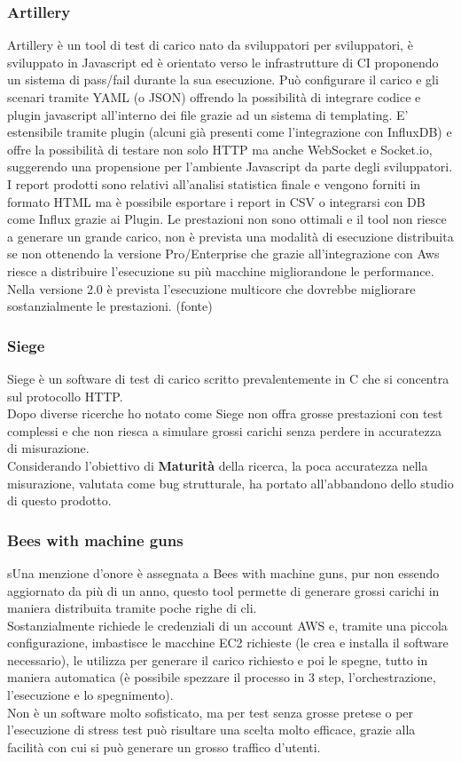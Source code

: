 \subsubsection{Artillery}
Artillery è un tool di test di carico nato da sviluppatori per sviluppatori, è sviluppato in Javascript ed è orientato verso le infrastrutture di CI proponendo un sistema di pass/fail durante la sua esecuzione.
Può configurare il carico e gli scenari tramite YAML (o JSON) offrendo la possibilità di integrare codice e plugin javascript all’interno dei file grazie ad un sistema di templating.
E’ estensibile tramite plugin (alcuni già presenti come l’integrazione con InfluxDB) e offre la possibilità di testare non solo HTTP ma anche WebSocket e Socket.io, suggerendo una propensione per l’ambiente Javascript da parte degli sviluppatori.
I report prodotti sono relativi all’analisi statistica finale e vengono forniti in formato HTML ma è possibile esportare i report in CSV o integrarsi con DB come Influx grazie ai Plugin.
Le prestazioni non sono ottimali e il tool non riesce a generare un grande carico, non è prevista una modalità di esecuzione distribuita se non ottenendo la versione Pro/Enterprise che grazie all’integrazione con Aws riesce a distribuire l’esecuzione su più macchine migliorandone le performance.
Nella versione 2.0 è prevista l’esecuzione multicore che dovrebbe migliorare sostanzialmente le prestazioni. (fonte)
\subsubsection{Siege}
Siege è un software di test di carico scritto prevalentemente in C che si concentra sul protocollo HTTP.\\
Dopo diverse ricerche ho notato come Siege non offra grosse prestazioni con test complessi e che non riesca a simulare grossi carichi senza perdere in accuratezza di misurazione.\\
Considerando l'obiettivo di \textbf{Maturità} della ricerca, la poca accuratezza nella misurazione, valutata come bug strutturale, ha portato all'abbandono dello studio di questo prodotto.
\subsubsection{Bees with machine guns}
sUna menzione d’onore è assegnata a Bees with machine guns, pur non essendo aggiornato da più di un anno, questo tool permette di generare grossi carichi in maniera distribuita tramite poche righe di \gls{cli}.\\
Sostanzialmente richiede le credenziali di un account AWS e, tramite una piccola configurazione, imbastisce le macchine EC2 richieste (le crea e installa il software necessario), le utilizza per generare il carico richiesto e poi le spegne, tutto in maniera automatica (è possibile spezzare il processo in 3 step, l’orchestrazione, l’esecuzione e lo spegnimento).\\
Non è un software molto sofisticato, ma per test senza grosse pretese o per l'esecuzione di stress test può risultare una scelta molto efficace,  grazie alla facilità con cui si può generare un grosso traffico d'utenti. 
